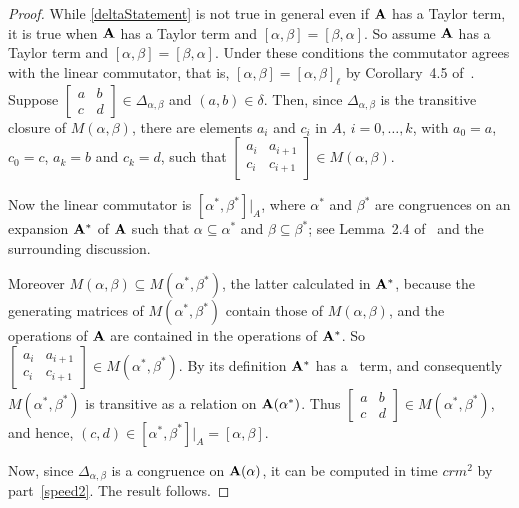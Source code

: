\documentclass{ws-ijac}
\begin{document}
\begin{proof}
While \eqref{deltaStatement} is not true in general even if
$\mathbf{A}$ has a Taylor term, it is true when
$\mathbf{A}$ has a Taylor term and $[\alpha,\beta] = [\beta,\alpha]$.
So assume $\mathbf{A}$ has a Taylor term and $[\alpha,\beta] = [\beta,\alpha]$.
Under these conditions the commutator agrees with the
linear commutator, that is, $[\alpha,\beta] = [\alpha,\beta]_\ell$ by
Corollary~4.5 of~\cite{MR1663558}.
Suppose
$
\begin{bmatrix}
a&b\\c&d
\end{bmatrix}\in \Delta_{\alpha,\beta}$ and $(a,b)\in \delta$.
Then, since
$\Delta_{\alpha,\beta}$ is the transitive closure of
$M(\alpha,\beta)$, there are
elements $a_i$ and $c_i$ in $A$,
$i = 0, \ldots, k$, with $a_0 =a$,  $c_0 = c$, $a_k = b$ and
$c_k = d$, such that
$
\begin{bmatrix}
a_i&a_{i+1}\\c_i&c_{i+1}
\end{bmatrix}\in M(\alpha,\beta)$.

Now the linear commutator is $[\alpha^*,\beta^*]\big\vert_{A}$,
where $\alpha^*$ and $\beta^*$ are congruences on an expansion
$\mathbf{A}^*$ of $\mathbf{A}$ such that $\alpha \subseteq \alpha^*$
and $\beta \subseteq \beta^*$; see Lemma~2.4 of~\cite{MR1663558}
and the surrounding discussion.

Moreover $M(\alpha,\beta) \subseteq M(\alpha^*,\beta^*)$, the latter
calculated in $\mathbf{A}^*$, because the generating matrices of
$M(\alpha^*,\beta^*)$ contain those of $M(\alpha,\beta)$, and
the operations of $\mathbf{A}$ are contained in the operations
of $\mathbf{A}^*$.  So
$
\begin{bmatrix}
a_i&a_{i+1}\\c_i&c_{i+1}
\end{bmatrix}\in M(\alpha^*,\beta^*)$.
By its definition $\mathbf{A}^*$ has a \malcev\ term, and
consequently $M(\alpha^*,\beta^*)$ is transitive as
a relation on $\mathbf{A}(\alpha^*)$. Thus
$
\begin{bmatrix}
a&b\\c&d
\end{bmatrix}\in M(\alpha^*,\beta^*)$, and hence,
$(c,d) \in [\alpha^*,\beta^*]\big\vert_A = [\alpha,\beta]$.

Now, since $\Delta_{\alpha,\beta}$ is a congruence on
$\mathbf{A}(\alpha)$, it can be computed in time
$crm^2$ by part~\eqref{speed2}. The result follows.
\end{proof}


\end{document}
